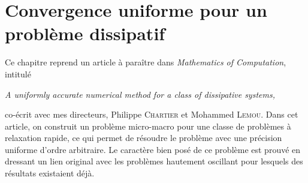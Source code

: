 
\clearemptydoublepage
\chapter{Convergence uniforme pour un problème dissipatif}
\label{chap:dissip-mima}

Ce chapitre reprend un article à paraître dans \textit{Mathematics of
Computation}, intitulé 
\begin{center}\itshape%
  A uniformly accurate numerical method for a class of dissipative
  systems,
\end{center}
co-écrit avec mes directeurs, Philippe \textsc{Chartier} et Mohammed \textsc{Lemou}. Dans cet article, on construit un problème micro-macro pour une classe de problèmes à relaxation rapide, ce qui permet de résoudre le problème avec une précision uniforme d'ordre arbitraire. Le caractère bien posé de ce problème est prouvé en dressant un lien original avec les problèmes hautement oscillant pour lesquels des résultats existaient déjà. 

















